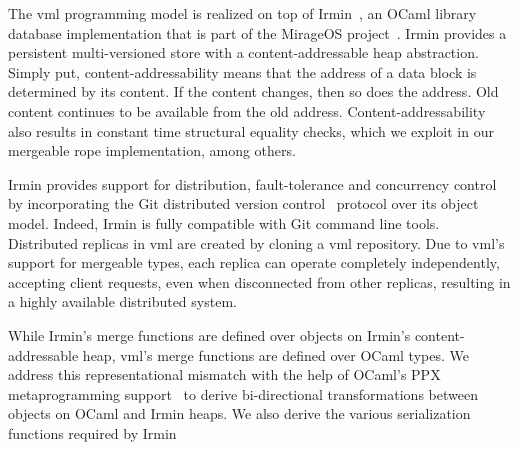 \documentclass[twocolumn,9pt]{extarticle}
\newcommand{\name}{{\sc vml}\xspace}
\begin{document}
The \name programming model is realized on top of Irmin~\cite{irmin}, an OCaml
library database implementation that is part of the MirageOS
project~\cite{mirage}. Irmin provides a persistent multi-versioned store with a
content-addressable heap abstraction. Simply put, content-addressability means
that the address of a data block is determined by its content. If the content
changes, then so does the address. Old content continues to be available from
the old address. Content-addressability also results in constant time
structural equality checks, which we exploit in our mergeable rope
implementation, among others.

Irmin provides support for distribution, fault-tolerance and concurrency
control by incorporating the Git distributed version control~\cite{git}
protocol over its object model. Indeed, Irmin is fully compatible with Git
command line tools. Distributed replicas in \name are created by cloning a
\name repository. Due to \name's support for mergeable types, each replica can
operate completely independently, accepting client requests, even when
disconnected from other replicas, resulting in a highly available distributed
system.

While Irmin's merge functions are defined over objects on Irmin's
content-addressable heap, \name's merge functions are defined over OCaml types.
We address this representational mismatch with the help of OCaml's PPX
metaprogramming support~\cite{ppx} to derive bi-directional transformations
between objects on OCaml and Irmin heaps. We also derive the various
serialization functions required by Irmin
\end{document}
